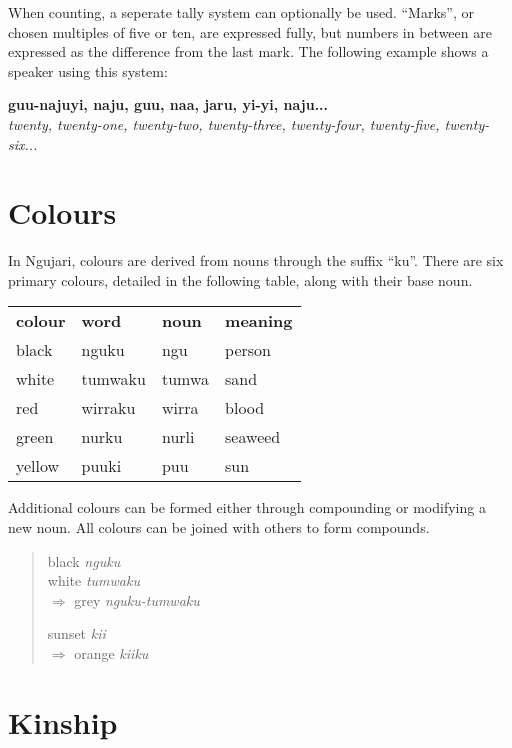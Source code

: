 When counting, a seperate tally system can optionally be used. ``Marks'', or
chosen multiples of five or ten, are expressed fully, but numbers in between are
expressed as the difference from the last mark. The following example shows a
speaker using this system:

\begin{sentence}
\textbf{guu-najuyi, naju, guu, naa, jaru, yi-yi, naju...}\\
\textit{twenty, twenty-one, twenty-two, twenty-three, twenty-four, twenty-five, twenty-six...}
\end{sentence}

\section{Colours}

In Ngujari, colours are derived from nouns through the suffix ``ku''. There are
six primary colours, detailed in the following table, along with their base noun.

\begin{table}[h]
\centering
\begin{tabular}{llll}
\textbf{colour} & \textbf{word} & \textbf{noun} & \textbf{meaning}\\
black & nguku & ngu & person\\
white & tumwaku & tumwa & sand\\
red & wirraku & wirra & blood\\
green & nurku & nurli & seaweed\\
yellow & puuki & puu & sun\\
\end{tabular}
\end{table}

Additional colours can be formed either through compounding or modifying a new
noun. All colours can be joined with others to form compounds.

\begin{quote}
\begin{multicols}{2}
black \textit{nguku}\\
white \textit{tumwaku}\\
$\Rightarrow$ grey \textit{nguku-tumwaku}

sunset \textit{kii}\\
$\Rightarrow$ orange \textit{kiiku}
\end{multicols}
\end{quote}

\section{Kinship}

